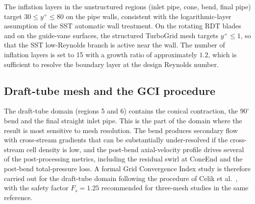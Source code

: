 The inflation layers in the unstructured regions (inlet pipe, cone, bend, final pipe) target $30 \leq y^+ \leq 80$ on the pipe walls, consistent with the logarithmic-layer assumption of the SST automatic wall treatment. On the rotating RDT blades and on the guide-vane surfaces, the structured TurboGrid mesh targets $y^+ \leq 1$, so that the SST low-Reynolds branch is active near the wall. The number of inflation layers is set to 15 with a growth ratio of approximately $1.2$, which is sufficient to resolve the boundary layer at the design Reynolds number.

\subsection{Draft-tube mesh and the GCI procedure}
\label{sec:gci_drafttube}

The draft-tube domain (regions 5 and 6) contains the conical contraction, the $90^\circ$ bend and the final straight inlet pipe. This is the part of the domain where the result is most sensitive to mesh resolution. The bend produces secondary flow with cross-stream gradients that can be substantially under-resolved if the cross-stream cell density is low, and the post-bend axial-velocity profile drives several of the post-processing metrics, including the residual swirl at ConeEnd and the post-bend total-pressure loss. A formal Grid Convergence Index study is therefore carried out for the draft-tube domain following the procedure of Celik et al.~\cite{Celik2008}, with the safety factor $F_s = 1.25$ recommended for three-mesh studies in the same reference.


